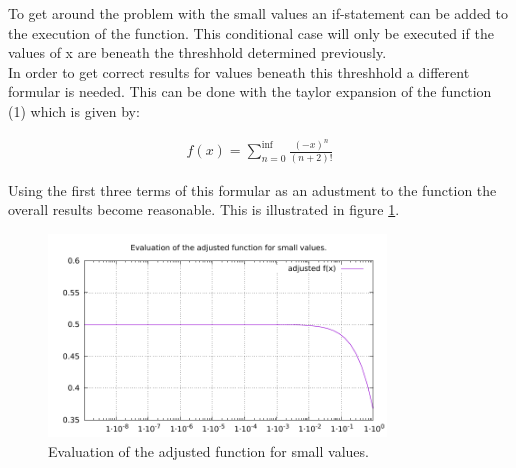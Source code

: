To get around the problem with the small values an if-statement can be
added to the execution of the function. This conditional case
will only be executed if the values of x are beneath the threshhold determined 
previously.\\
In order to get correct results for values beneath this threshhold
a different formular is needed. This can be done with the taylor
expansion of the function (1) which is given by:

\begin{align}
    f(x) = \sum_{n=0}^{\inf}\frac{(-x)^n}{(n+2)!}    
\end{align} 

Using the first three terms of this formular as an adustment to the function the overall 
results become reasonable. This is illustrated in figure \ref{fig::adjustedF}.

\begin{figure}[h]
    \centering
    \includegraphics[width=0.8\textwidth]{../analysis/adjustedF.pdf}
    \caption{Evaluation of the adjusted function for small values.}
    \label{fig::adjustedF}
\end{figure}
